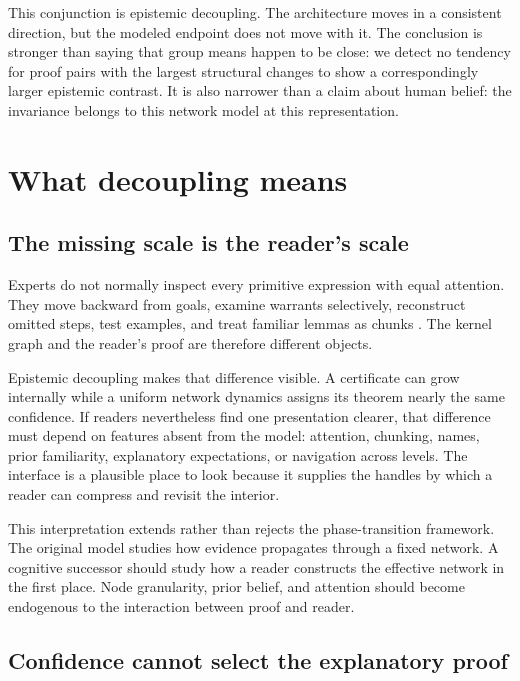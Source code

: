 \documentclass[11pt]{article}
\begin{document}
This conjunction is epistemic decoupling.  The architecture moves in a consistent direction, but
the modeled endpoint does not move with it.  The conclusion is stronger than saying that group
means happen to be close: we detect no tendency for proof pairs with the largest structural changes
to show a correspondingly larger epistemic contrast.  It is also narrower than a claim about human belief:
the invariance belongs to this network model at this representation.

\section{What decoupling means}

\subsection{The missing scale is the reader's scale}

Experts do not normally inspect every primitive expression with equal attention.  They move
backward from goals, examine warrants selectively, reconstruct omitted steps, test examples, and
treat familiar lemmas as chunks \citep{weber2008,inglis2012,mejiaramos2014,panse2018}.  The kernel
graph and the reader's proof are therefore different objects.

Epistemic decoupling makes that difference visible.  A certificate can grow internally while a
uniform network dynamics assigns its theorem nearly the same confidence.  If readers nevertheless
find one presentation clearer, that difference must depend on features absent from the model: attention,
chunking, names, prior familiarity, explanatory expectations, or navigation across levels.  The
interface is a plausible place to look because it supplies the handles by which a reader can compress
and revisit the interior.

This interpretation extends rather than rejects the phase-transition framework.  The original
model studies how evidence propagates through a fixed network.  A cognitive successor should study
how a reader constructs the effective network in the first place.  Node granularity, prior belief,
and attention should become endogenous to the interaction between proof and reader.

\subsection{Confidence cannot select the explanatory proof}
\end{document}
